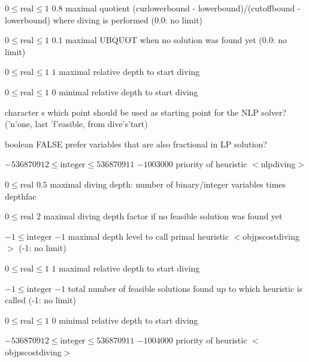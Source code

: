 %
{$0\leq\textrm{real}\leq1$}%
{$0.8$}%
{maximal quotient (curlowerbound - lowerbound)/(cutoffbound - lowerbound) where diving is performed (0.0: no limit)}%
{}

%
{$0\leq\textrm{real}\leq1$}%
{$0.1$}%
{maximal UBQUOT when no solution was found yet (0.0: no limit)}%
{}

%
{$0\leq\textrm{real}\leq1$}%
{$1$}%
{maximal relative depth to start diving}%
{}

%
{$0\leq\textrm{real}\leq1$}%
{$0$}%
{minimal relative depth to start diving}%
{}

%
{character}%
{s}%
{which point should be used as starting point for the NLP solver? ('n'one, last 'f'easible, from dive's'tart)}%
{}

%
{boolean}%
{FALSE}%
{prefer variables that are also fractional in LP solution?}%
{}

%
{$-536870912\leq\textrm{integer}\leq536870911$}%
{$-1003000$}%
{priority of heuristic $<$nlpdiving$>$}%
{}

%
{$0\leq\textrm{real}$}%
{$0.5$}%
{maximal diving depth: number of binary/integer variables times depthfac}%
{}

%
{$0\leq\textrm{real}$}%
{$2$}%
{maximal diving depth factor if no feasible solution was found yet}%
{}

%
{$-1\leq\textrm{integer}$}%
{$-1$}%
{maximal depth level to call primal heuristic $<$objpscostdiving$>$ (-1: no limit)}%
{}

%
{$0\leq\textrm{real}\leq1$}%
{$1$}%
{maximal relative depth to start diving}%
{}

%
{$-1\leq\textrm{integer}$}%
{$-1$}%
{total number of feasible solutions found up to which heuristic is called (-1: no limit)}%
{}

%
{$0\leq\textrm{real}\leq1$}%
{$0$}%
{minimal relative depth to start diving}%
{}

%
{$-536870912\leq\textrm{integer}\leq536870911$}%
{$-1004000$}%
{priority of heuristic $<$objpscostdiving$>$}%
{}

